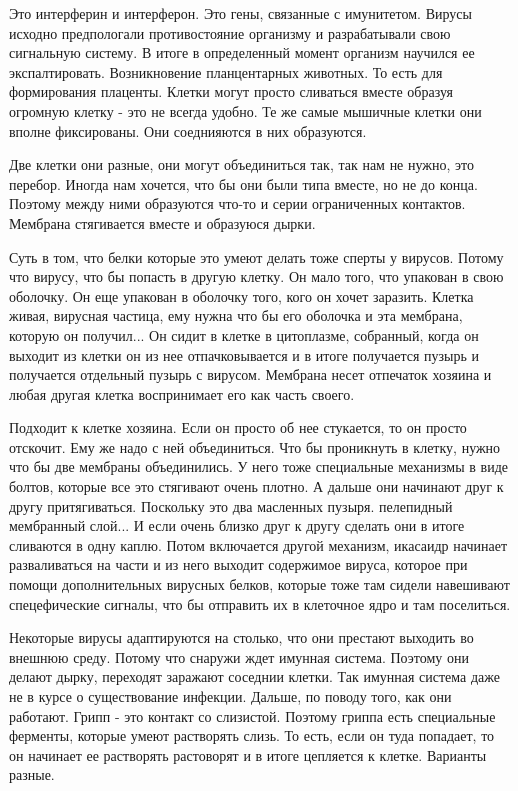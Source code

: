 Это интерферин и интерферон. Это гены, связанные с имунитетом. Вирусы исходно 
предпологали противостояние организму и разрабатывали свою 
сигнальную систему. В итоге в определенный момент организм научился 
ее экспалтировать. Возникновение планцентарных животных. То есть 
для формирования плаценты. Клетки могут просто сливаться 
вместе образуя огромную клетку - это не всегда 
удобно. Те же самые мышичные клетки они вполне фиксированы. 
Они соеднияются в них образуются. 

Две клетки они разные, они могут объединиться так, так нам не нужно, 
это перебор. Иногда нам хочется, что бы 
они были типа вместе, но не до конца. Поэтому между  ними образуются 
что-то и серии ограниченных контактов. Мембрана стягивается 
вместе и образуюся дырки. 

Суть в том, что белки которые это умеют делать тоже сперты у вирусов. 
Потому что вирусу, что бы попасть в другую клетку. Он мало того, что 
упакован в свою оболочку. Он еще упакован в оболочку того, кого он хочет заразить. 
Клетка живая, вирусная частица, ему нужна что бы его оболочка и эта мембрана, 
которую он получил... Он сидит в клетке в цитоплазме, 
собранный, когда он выходит из клетки он из нее отпачковывается и 
в итоге получается пузырь и получается отдельный пузырь с вирусом. Мембрана несет отпечаток
хозяина и любая другая клетка воспринимает его как 
часть своего. 

Подходит к клетке хозяина. Если он просто об нее стукается, то он просто отскочит. Ему же
надо с ней объединиться. Что бы проникнуть в клетку, нужно что бы 
две мембраны объединились. У него тоже специальные механизмы в виде болтов, 
которые все это стягивают очень плотно. А дальше они начинают друг к другу притягиваться. 
Поскольку это два масленных пузыря. пелепидный мембранный слой... И если очень близко 
друг к другу сделать они в итоге сливаются в одну каплю. Потом включается 
другой механизм, икасаидр начинает 
разваливаться на части и из него выходит содержимое вируса, которое при помощи 
дополнительных вирусных 
белков, которые тоже там сидели навешивают спецефические сигналы, что 
бы отправить их в клеточное ядро и там поселиться. 

Некоторые вирусы адаптируются на столько, что они престают выходить во внешнюю
среду. Потому что снаружи ждет имунная система. Поэтому они делают дырку, переходят 
заражают соседнии клетки. Так имунная система даже не в курсе о существование инфекции. 
Дальше, по поводу того, как они работают. Грипп - это контакт со слизистой. Поэтому 
гриппа есть специальные ферменты, которые умеют растворять слизь. То есть, если 
он туда попадает, то он начинает ее растворять растоворят и в итоге цепляется к клетке. 
Варианты разные. 

